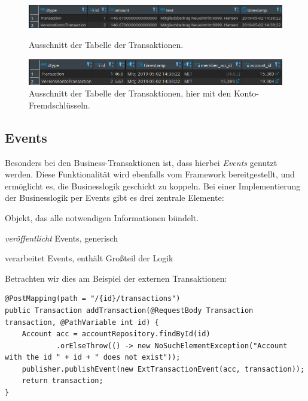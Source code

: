 \documentclass[a4paper, 11pt]{article}
\providecommand{\tightlist}{%
  \setlength{\itemsep}{0pt}\setlength{\parskip}{0pt}}
\begin{document}
\begin{figure}[htpb]
    \centering
    \includegraphics[width=\textwidth]{images/transaction_table.png}
    \caption{Ausschnitt der Tabelle der Transaktionen.}
    \label{fig:transaction_table}
    \vspace{0.5cm}
    \includegraphics[width=\textwidth]{images/transaction_table_1.png}
    \caption{Ausschnitt der Tabelle der Transaktionen, hier mit den Konto-Fremdschlüsseln.}
    \label{fig:transaction_table_1}
\end{figure}


\subsection{Events}

Besonders bei den Business-Transaktionen ist, dass hierbei \emph{Events}
genutzt werden. Diese Funktionalität wird ebenfalls vom Framework
bereitgestellt, und ermöglicht es, die Businesslogik geschickt zu koppeln. Bei
einer Implementierung der Businesslogik per Events gibt es drei zentrale
Elemente:

\begin{description}
\tightlist
\item[Event] Objekt, das alle notwendigen Informationen bündelt.
\item[Eventpublisher] \emph{veröffentlicht} Events, generisch
\item[Eventlistener] verarbeitet Events, enthält Großteil der Logik
\end{description}

Betrachten wir dies am Beispiel der externen Transaktionen:

\begin{lstlisting}[caption={Ausschnitt aus dem \lstinline{AccountController}, in dem ein Event veröffentlicht wird},label=lst_evpub, float]
@PostMapping(path = "/{id}/transactions")
public Transaction addTransaction(@RequestBody Transaction transaction, @PathVariable int id) {
    Account acc = accountRepository.findById(id)
            .orElseThrow(() -> new NoSuchElementException("Account with the id " + id + " does not exist"));
    publisher.publishEvent(new ExtTransactionEvent(acc, transaction));
    return transaction;
}
\end{lstlisting}
\end{document}
